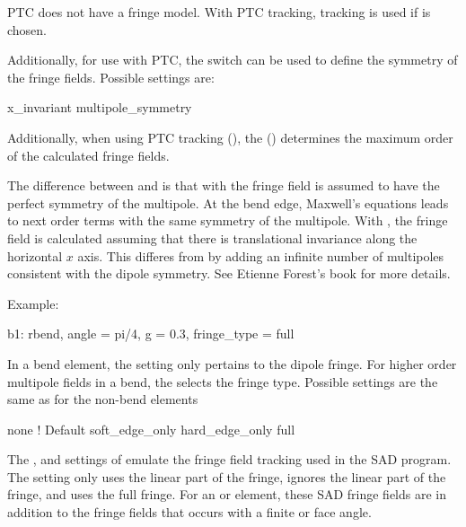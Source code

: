 PTC does not have a  fringe model.
With PTC tracking,  tracking is used if  is chosen.

Additionally, for use with PTC, the  switch can be used
to define the symmetry of the fringe fields. Possible settings are:
\begin{example}
  x_invariant
  multipole_symmetry
\end{example}
Additionally, when using PTC tracking (), the
 () determines the maximum
order of the calculated fringe fields.

The difference between  and  is that
with  the fringe field is assumed to have the
perfect symmetry of the multipole. At the bend edge, Maxwell's
equations leads to next order terms with the same symmetry of the
multipole. With , the fringe field is calculated
assuming that there is translational invariance along the horizontal
$x$ axis. This differes from  by adding an infinite
number of multipoles consistent with the dipole symmetry. See Etienne
Forest's book\cite{b:forest} for more details.

Example:
\begin{example}
  b1: rbend, angle = pi/4, g = 0.3, fringe_type = full
\end{example}

In a bend element, the  setting only pertains to the
dipole fringe.  For higher order multipole fields in a bend, the
 selects the fringe type. Possible
settings are the same as for the non-bend  elements
\begin{example}
  none              ! Default 
  soft_edge_only
  hard_edge_only
  full
\end{example}

The ,  and  settings
of  emulate the fringe field tracking used in the SAD
program\cite{b:sad}.  The  setting only uses the linear
part of the fringe,  ignores the linear part of
the fringe, and  uses the full fringe.  For an 
or  element, these SAD fringe fields are in addition to the
fringe fields that occurs with a finite  or  face
angle. 

